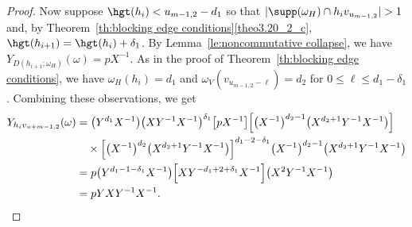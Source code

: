 \begin{proof}
 Now suppose $\hgt(h_i)<u_{m-1,2}-d_1$ so that $|\supp(\omega_H)\cap h_iv_{u_{m-1,2}}|>1$ and, by Theorem~\ref{th:blocking edge conditions}\ref{theo3.20_2_c}, $\hgt(h_{i+1})=\hgt(h_i)+\delta_1$.
 By Lemma~\ref{le:noncommutative collapse}, we have $Y_{D(h_{i+1};\omega_H)}(\omega)=pX^{-1}$.
 As in the proof of Theorem~\ref{th:blocking edge conditions}, we have $\omega_H(h_i)=d_1$ and $\omega_V(v_{u_{m-1,2}-\ell})=d_2$ for $0\le\ell\le d_1-\delta_1$.
 Combining these observations, we get
 \begin{align*}
 Y_{h_iv_{u+{m-1,2}}}(\omega) 
 &=\big(Y^{d_1}X^{-1}\big)\big(XY^{-1}X^{-1}\big)^{\delta_1}\big[pX^{-1}\big]\Big[\big(X^{-1}\big)^{d_2-1}\big(X^{d_2+1}Y^{-1}X^{-1}\big)\Big]\\
 &\quad\times\Big[\big(X^{-1}\big)^{d_2}\big(X^{d_2+1}Y^{-1}X^{-1}\big)\Big]^{d_1-2-\delta_1}\big(X^{-1}\big)^{d_2-1}\big(X^{d_2+1}Y^{-1}X^{-1}\big)\\
 &=p\big(Y^{d_1-1-\delta_1}X^{-1}\big)\Big[XY^{-d_1+2+\delta_1}X^{-1}\Big]\big(X^2Y^{-1}X^{-1}\big)\\
 &=pYXY^{-1}X^{-1}.\qedhere
 \end{align*}
\end{proof}

